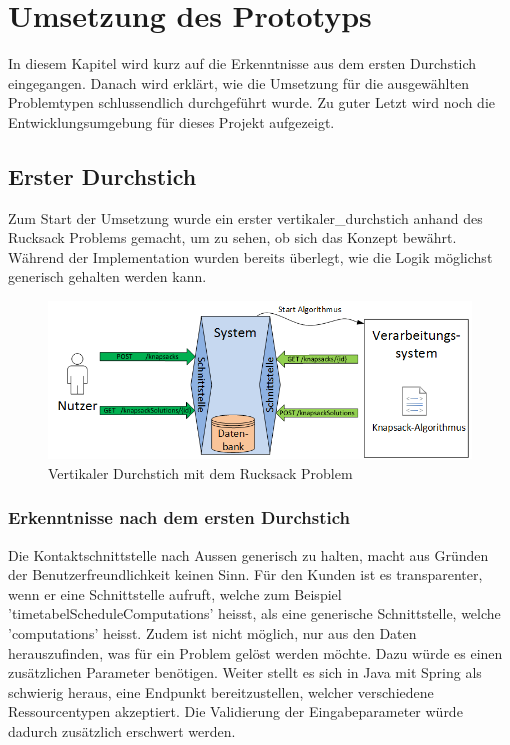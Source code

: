 %
%

\chapter{Umsetzung des Prototyps \resultAssignment{[R5]}}\label{chap.umsetzung}
In diesem Kapitel wird kurz auf die Erkenntnisse aus dem ersten Durchstich eingegangen. Danach wird erklärt, wie die Umsetzung für die ausgewählten Problemtypen schlussendlich 
durchgeführt wurde. Zu guter Letzt wird noch die Entwicklungsumgebung für dieses Projekt aufgezeigt.

\section{Erster Durchstich}\label{entwicklungsumgebung}
Zum Start der Umsetzung wurde ein erster \gls{vertikaler_durchstich} anhand des Rucksack Problems gemacht, um zu sehen, ob sich das Konzept bewährt. Während der 
Implementation wurden bereits überlegt, wie die Logik möglichst generisch gehalten werden kann.

\begin{figure}[h]
\centering
\includegraphics[scale=0.74]{images/visio/prototype_knapsack.png}
\caption[\Gls{vertikaler_durchstich} mit dem Rucksack Problem]{Vertikaler Durchstich mit dem Rucksack Problem \selfmade{}}
\label{fig:prototyp_knapsack}
\end{figure}

\subsection{Erkenntnisse nach dem ersten Durchstich}\label{learning_prototyp}
Die Kontaktschnittstelle nach Aussen generisch zu halten, macht aus Gründen der Benutzerfreundlichkeit keinen Sinn. Für den Kunden ist es transparenter, wenn er eine Schnittstelle aufruft, 
welche zum Beispiel 'timetabelScheduleComputations' heisst, als eine generische Schnittstelle, welche 'computations' heisst. Zudem ist nicht möglich, nur aus den Daten herauszufinden, was für 
ein Problem gelöst werden möchte. Dazu würde es einen zusätzlichen Parameter benötigen. Weiter stellt es sich in Java mit Spring als schwierig heraus, eine Endpunkt bereitzustellen, welcher 
verschiedene Ressourcentypen akzeptiert. Die Validierung der Eingabeparameter würde dadurch zusätzlich erschwert werden.

